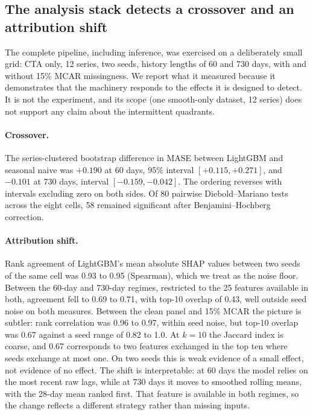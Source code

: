 \documentclass[11pt]{article}
\begin{document}
\subsection{The analysis stack detects a crossover and an attribution shift}
\label{sec:smoke}

The complete pipeline, including inference, was exercised on a deliberately small
grid: CTA only, 12 series, two seeds, history lengths of 60 and 730 days, with and
without 15\% MCAR missingness. We report what it measured because it demonstrates
that the machinery responds to the effects it is designed to detect. It is not the
experiment, and its scope (one smooth-only dataset, 12 series) does not support
any claim about the intermittent quadrants.

\paragraph{Crossover.} The series-clustered bootstrap difference in MASE between
LightGBM and seasonal naive was $+0.190$ at 60 days, 95\% interval
$[+0.115, +0.271]$, and $-0.101$ at 730 days, interval $[-0.159, -0.042]$. The
ordering reverses with intervals excluding zero on both sides. Of 80 pairwise
Diebold--Mariano tests across the eight cells, 58 remained significant after
Benjamini--Hochberg correction.

\paragraph{Attribution shift.} Rank agreement of LightGBM's mean absolute SHAP
values between two seeds of the same cell was 0.93 to 0.95 (Spearman), which we
treat as the noise floor. Between the 60-day and 730-day regimes, restricted to
the 25 features available in both, agreement fell to 0.69 to 0.71, with top-10
overlap of 0.43, well outside seed noise on both measures. Between the clean panel
and 15\% MCAR the picture is subtler: rank correlation was 0.96 to 0.97, within
seed noise, but top-10 overlap was 0.67 against a seed range of 0.82 to 1.0. At
$k = 10$ the Jaccard index is coarse, and 0.67 corresponds to two features
exchanged in the top ten where seeds exchange at most one. On two seeds this is
weak evidence of a small effect, not evidence of no effect. The shift is
interpretable: at 60 days the model relies on the most recent raw lags, while at
730 days it moves to smoothed rolling means, with the 28-day mean ranked first.
That feature is available in both regimes, so the change reflects a different
strategy rather than missing inputs.
\end{document}
